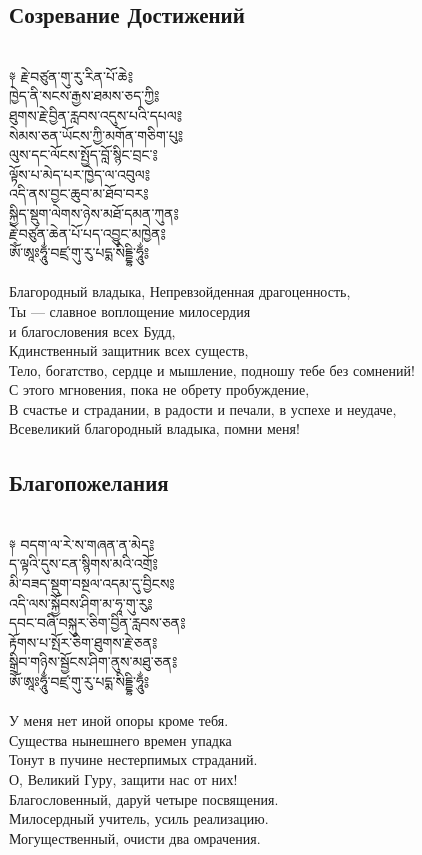 \subsection{Созревание Достижений}
\\
\ti
༈ རྗེ་བཙུན་གུ་རུ་རིན་པོ་ཆེ༔ \\
ཁྱེད་ནི་སངས་རྒྱས་ཐམས་ཅད་ཀྱི༔ \\
ཐུགས་རྗེ་བྱིན་རླབས་འདུས་པའི་དཔལ༔ \\
སེམས་ཅན་ཡོངས་ཀྱི་མགོན་གཅིག་པུ༔ \\
ལུས་དང་ལོངས་སྤྱོད་བློ་སྙིང་བྲང་༔ \\
ལྟོས་པ་མེད་པར་ཁྱེད་ལ་འབུལ༔ \\
འདི་ནས་བྱང་ཆུབ་མ་ཐོབ་བར༔\\
སྐྱིད་སྡུག་ལེགས་ཉེས་མཐོ་དམན་ཀུན༔\\
རྗེ་བཙུན་ཆེན་པོ་པད་འབྱུང་མཁྱེན༔\\
ཨོཾ་ཨཱཿཧཱུྂ་བཛྲ་གུ་རུ་པདྨ་སིདྡྷི་ཧཱུྂ༔\\
\\
\ru
Благородный владыка, Непревзойденная драгоценность,\\
Ты — славное воплощение милосердия \\
и благословения всех Будд,\\
Кдинственный защитник всех существ,\\
Тело, богатство, сердце и мышление, подношу тебе без сомнений!\\
С этого мгновения, пока не обрету пробуждение,\\
В счастье и страдании, в радости и печали, в успехе и неудаче,\\
Всевеликий благородный владыка, помни меня!
\newpage
\subsection{Благопожелания}
\\
\ti
༈ བདག་ལ་རེ་ས་གཞན་ན་མེད༔\\
ད་ལྟའི་དུས་ངན་སྙིགས་མའི་འགྲོ༔\\
མི་བཟད་སྡུག་བསྔལ་འདམ་དུ་བྱིངས༔\\
འདི་ལས་སྐྱོབས་ཤིག་མ་ཧཱ་གུ་རུ༔\\
དབང་བཞི་བསྐུར་ཅིག་བྱིན་རླབས་ཅན༔\\
རྟོགས་པ་སྤོར་ཅིག་ཐུགས་རྗེ་ཅན༔\\
སྒྲིབ་གཉིས་སྦྱོངས་ཤིག་ནུས་མཐུ་ཅན༔\\
ཨོཾ་ཨཱཿཧཱུྂ་བཛྲ་གུ་རུ་པདྨ་སིདྡྷི་ཧཱུྂ༔\\
\\
\ru
У меня нет иной опоры кроме тебя.\\
Существа нынешнего времен упадка\\
Тонут в пучине нестерпимых страданий.\\
О, Великий Гуру, защити нас от них!\\
Благословенный, даруй четыре посвящения.\\
Милосердный учитель, усиль реализацию.\\
Могущественный, очисти два омрачения.\\
\newpage
